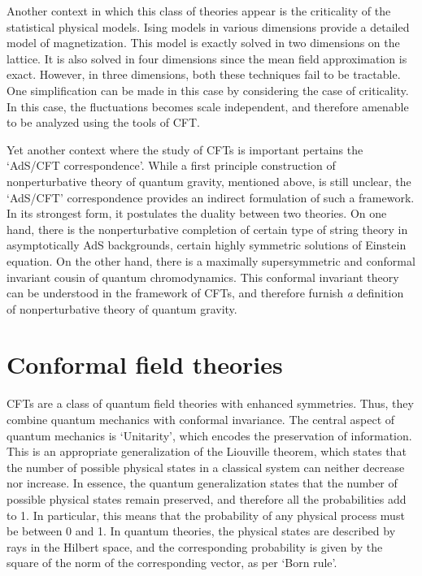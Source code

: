 Another context in which this class of theories appear is the criticality of the statistical physical models.
Ising models in various dimensions provide a detailed model of magnetization.
This model is exactly solved in two dimensions on the lattice.
It is also solved in four dimensions since the mean field approximation is exact.
However, in three dimensions, both these techniques fail to be tractable.
One simplification can be made in this case by considering the case of criticality.
In this case, the fluctuations becomes scale independent, and therefore amenable to be analyzed using the tools of CFT.

Yet another context where the study of CFTs is important pertains the `AdS/CFT correspondence'.
While a first principle construction of nonperturbative theory of quantum gravity, mentioned above, is still unclear, the `AdS/CFT' correspondence provides an indirect formulation of such a framework.
In its strongest form, it postulates the duality between two theories.
On one hand, there is the nonperturbative completion of certain type of string theory in asymptotically AdS backgrounds, certain highly symmetric solutions of Einstein equation.
On the other hand, there is a maximally supersymmetric and conformal invariant cousin of quantum chromodynamics.
This conformal invariant theory can be understood in the framework of CFTs, and therefore furnish \textit{a} definition of nonperturbative theory of quantum gravity.
\section*{Conformal field theories}
CFTs are a class of quantum field theories with enhanced symmetries.
Thus, they combine quantum mechanics with conformal invariance.
The central aspect of quantum mechanics is `Unitarity', which encodes the preservation of information.
This is an appropriate generalization of the Liouville theorem, which states that the number of possible physical states in a classical system can neither decrease nor increase.
In essence, the quantum generalization states that the number of possible physical states remain preserved, and therefore all the probabilities add to 1.
In particular, this means that the probability of any physical process must be between 0 and 1.
In quantum theories, the physical states are described by rays in the Hilbert space, and the corresponding probability is given by the square of the norm of the corresponding vector, as per `Born rule'.

